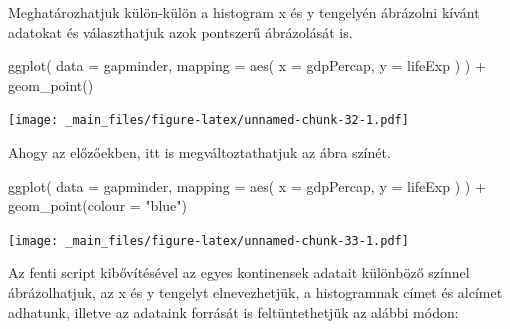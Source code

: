 \documentclass[
]{book}
\newenvironment{Shaded}{\begin{snugshade}}{\end{snugshade}}
\newcommand{\AttributeTok}[1]{\textcolor[rgb]{0.77,0.63,0.00}{#1}}
\newcommand{\FunctionTok}[1]{\textcolor[rgb]{0.00,0.00,0.00}{#1}}
\newcommand{\NormalTok}[1]{#1}
\newcommand{\SpecialCharTok}[1]{\textcolor[rgb]{0.00,0.00,0.00}{#1}}
\newcommand{\StringTok}[1]{\textcolor[rgb]{0.31,0.60,0.02}{#1}}
\begin{document}
Meghatározhatjuk külön-külön a histogram x és y tengelyén ábrázolni
kívánt adatokat és választhatjuk azok pontszerű ábrázolását is.

\begin{Shaded}
\begin{Highlighting}[]
\FunctionTok{ggplot}\NormalTok{(}
  \AttributeTok{data =}\NormalTok{ gapminder,}
  \AttributeTok{mapping =} \FunctionTok{aes}\NormalTok{(}
    \AttributeTok{x =}\NormalTok{ gdpPercap,}
    \AttributeTok{y =}\NormalTok{ lifeExp}
\NormalTok{  )}
\NormalTok{) }\SpecialCharTok{+}
  \FunctionTok{geom\_point}\NormalTok{() }
\end{Highlighting}
\end{Shaded}

\texttt{[image: \_main\_files/figure-latex/unnamed-chunk-32-1.pdf]}

Ahogy az előzőekben, itt is megváltoztathatjuk az ábra színét.

\begin{Shaded}
\begin{Highlighting}[]
\FunctionTok{ggplot}\NormalTok{(}
  \AttributeTok{data =}\NormalTok{ gapminder,}
  \AttributeTok{mapping =} \FunctionTok{aes}\NormalTok{(}
    \AttributeTok{x =}\NormalTok{ gdpPercap,}
    \AttributeTok{y =}\NormalTok{ lifeExp}
\NormalTok{  )}
\NormalTok{) }\SpecialCharTok{+}
  \FunctionTok{geom\_point}\NormalTok{(}\AttributeTok{colour =} \StringTok{"blue"}\NormalTok{)}
\end{Highlighting}
\end{Shaded}

\texttt{[image: \_main\_files/figure-latex/unnamed-chunk-33-1.pdf]}

Az fenti script kibővítésével az egyes kontinensek adatait különböző
színnel ábrázolhatjuk, az x és y tengelyt elnevezhetjük, a histogramnak
címet és alcímet adhatunk, illetve az adataink forrását is
feltüntethetjük az alábbi módon:

\begin{Shaded}
\end{Shaded}
\end{document}
